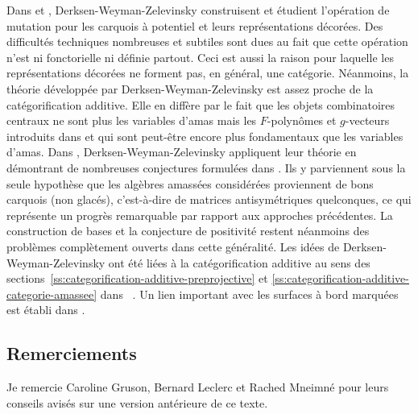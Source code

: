 \documentclass[brochure,12pt]{bourbaki}
\numberwithin{equation}{subsection}
\numberwithin{theorem}{section}
\begin{document}
Dans \cite{DerksenWeymanZelevinsky08} et \cite{DerksenWeymanZelevinsky09},
Derksen-Weyman-Zelevinsky  construisent et \'etudient l'op\'eration de
mutation pour les carquois \`a potentiel et leurs repr\'esentations d\'ecor\'ees.
Des difficult\'es techniques nombreuses et subtiles sont dues au
fait que cette op\'eration n'est ni fonctorielle ni d\'efinie partout.
Ceci est aussi la raison pour laquelle les repr\'esentations d\'ecor\'ees
ne forment pas, en g\'en\'eral, une cat\'egorie. N\'eanmoins,
la th\'eorie d\'evelopp\'ee par Derksen-Weyman-Zelevinsky est
assez proche de la cat\'egorification additive. Elle en diff\`ere
par le fait que les objets combinatoires centraux ne sont
plus les variables d'amas mais les $F$-polyn\^omes et $g$-vecteurs
introduits dans \cite{FominZelevinsky07} et qui sont peut-\^etre
encore plus fondamentaux que les variables d'amas.
Dans \cite{DerksenWeymanZelevinsky09}, Derksen-Weyman-Zelevinsky
appliquent leur th\'eorie en d\'emontrant de nombreuses conjectures
formul\'ees dans \cite{FominZelevinsky07}. Ils y parviennent
sous la seule hypoth\`ese que les alg\`ebres amass\'ees consid\'er\'ees
proviennent de bons carquois (non glac\'es), c'est-\`a-dire de matrices
antisym\'etriques quelconques, ce qui repr\'esente un
progr\`es remarquable par rapport aux approches pr\'ec\'edentes.
La construction de bases et la conjecture de positivit\'e restent
n\'eanmoins des probl\`emes compl\`etement ouverts dans cette
g\'en\'eralit\'e. Les id\'ees de Derksen-Weyman-Zelevinsky ont \'et\'e
li\'ees \`a la cat\'egorification additive au sens des
sections~\ref{ss:categorification-additive-preprojective}
et \ref{ss:categorification-additive-categorie-amassee} dans \cite{BuanIyamaReitenSmith08}
\cite{KellerYang09}~\cite{Amiot08a}. Un lien important avec
les surfaces \`a bord marqu\'ees est \'etabli dans \cite{Labardini09a}.

\bigskip\bigskip

 \subsection*{Remerciements}
 Je remercie 
 Caroline Gruson,
 Bernard Leclerc et
 Rached Mneimn\'e
 pour leurs conseils avis\'es sur une version
 ant\'erieure de ce texte.

\bigskip\bigskip\bigskip
\end{document}
